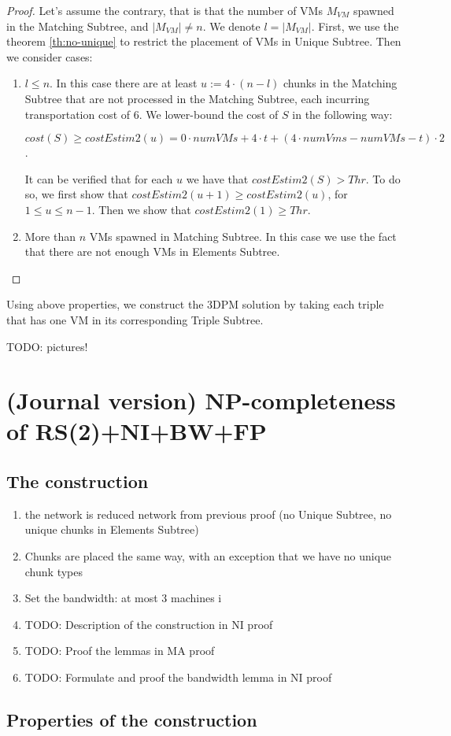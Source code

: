 \begin{proof}
  Let's assume the contrary, that is that the number of VMs $M_{VM}$ spawned in
  the Matching Subtree, and $|M_{VM}| \neq n$. We denote
  $l=|M_{VM}|$. First, we use the theorem
  \ref{th:no-unique} to restrict the placement of VMs in Unique Subtree. Then we consider cases:
  \begin{enumerate}
    \item $l \leq n$. In this case there are at least $u := 4 \cdot (n-l)$
      chunks in the Matching Subtree that are not processed in the
      Matching Subtree, each incurring transportation cost of $6$. We
      lower-bound the cost of $S$ in the following way:

$cost(S) \geq costEstim2(u) = 0\cdot numVMs + 4\cdot t + (4\cdot
numVms - numVMs - t)\cdot 2$. 

It can be verified that for each $u$ we have that $costEstim2(S) > Thr$. To
do so, we first show that $costEstim2(u+1) \geq costEstim2(u)$, for
$1\leq u \leq n-1$. Then we show that $costEstim2(1) \geq Thr$.

    \item More than $n$ VMs spawned in Matching Subtree. In this case we use the fact that there are not enough VMs in Elements Subtree.

  \end{enumerate}
\end{proof}

Using above properties, we construct the 3DPM solution by taking each
triple that has one VM in its corresponding Triple Subtree.

TODO: pictures!

\section{(Journal version) NP-completeness of RS(2)+NI+BW+FP}

\subsection{The construction}

\begin{enumerate}
\item the network is reduced network from previous proof (no Unique Subtree, no unique chunks in Elements Subtree)
\item Chunks are placed the same way, with an exception that we have no unique chunk types
\item Set the bandwidth: at most 3 machines i
\item TODO: Description of the construction in NI proof
\item TODO: Proof the lemmas in MA proof
\item TODO: Formulate and proof the bandwidth lemma in NI proof
\end{enumerate}

\subsection{Properties of the construction}